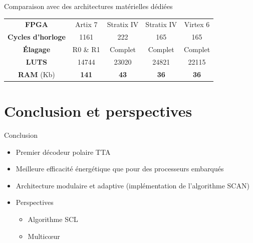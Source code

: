 \documentclass[t,compress,mathserif,12pt,xcolor=dvipsnames]{beamer}
\begin{document}
\begin{frame}[c]{Comparaison avec des architectures matérielles dédiées}
{\begin{table}
{{\begin{tabular}{c|c|c|c|c}
					\textbf{FPGA}         &  Artix 7       & Stratix IV            & Stratix IV         & Virtex 6             \\
					\textbf{Cycles d'horloge}   &  1161          & 222                   & 165                & 165                  \\
					\textbf{\'Elagage}        &  R0 \& R1      & Complet                  & Complet               & Complet                  \\
					\textbf{LUTS}           &  14744         & 23020                 & 24821              & 22115                \\
					\textbf{RAM} (Kb)       &  \textbf{141}  & \textbf{43}           & \textbf{36}        & \textbf{36}          \\


				\end{tabular}
			}}
			\end{table}
		}
\end{frame}

\section{Conclusion et perspectives}


\begin{frame}[c]{Conclusion}

	\begin{itemize}
		\item<+-> Premier décodeur polaire TTA
		\vspace{0.3cm}
		\item<+-> Meilleure efficacité énergétique que pour des processeurs embarqués
		\vspace{0.3cm}
		\item<+-> Architecture modulaire et adaptive (implémentation de l'algorithme SCAN)
		\vspace{0.3cm}
		\item<+-> Perspectives
		\begin{itemize}
			\item<+-> Algorithme SCL
			\item<+-> Multicœur
		\end{itemize}
	\end{itemize}

\end{frame}
\end{document}
